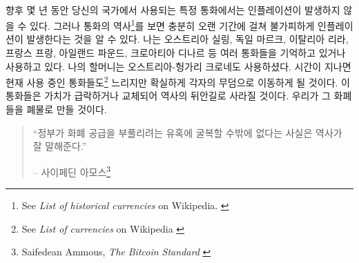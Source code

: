 \paragraph{}
향후 몇 년 동안 당신의 국가에서 사용되는 특정 통화에서는 인플레이션이 발생하지 않을 수 있다. 
그러나 통화의 역사\footnote{See \textit{List of historical currencies} on Wikipedia.
\cite{wiki:historical-currencies}}를
보면 충분히 오랜 기간에 걸쳐 불가피하게 인플레이션이 발생한다는 것을 알 수 있다.
나는 오스트리아 실링, 독일 마르크, 이탈리아 리라, 프랑스 프랑, 아일랜드 파운드, 크로아티아 디나르 등 여러
통화들을 기억하고 있거나 사용하고 있다. 
나의 할머니는 오스트리아-헝가리 크로네도 사용하셨다. 
시간이 지나면 현재 사용 중인 통화들도\footnote{See
	\textit{List of currencies} on Wikipedia \cite{wiki:list-of-currencies}}
	느리지만 확실하게 각자의 무덤으로 이동하게 될 것이다.
이 통화들은 가치가 급락하거나 교체되어 역사의 뒤안길로 사라질 것이다.
우리가 그 화폐들을 폐물로 만들 것이다.

\begin{quotation}\begin{samepage}
\enquote{정부가 화폐 공급을 부풀리려는 유혹에 굴복할 수밖에 없다는 사실은 역사가 잘 말해준다.}
\begin{flushright} -- 사이페딘 아모스\footnote{Saifedean Ammous, \textit{The Bitcoin
Standard} \cite{bitcoin-standard}}
\end{flushright}\end{samepage}\end{quotation}

